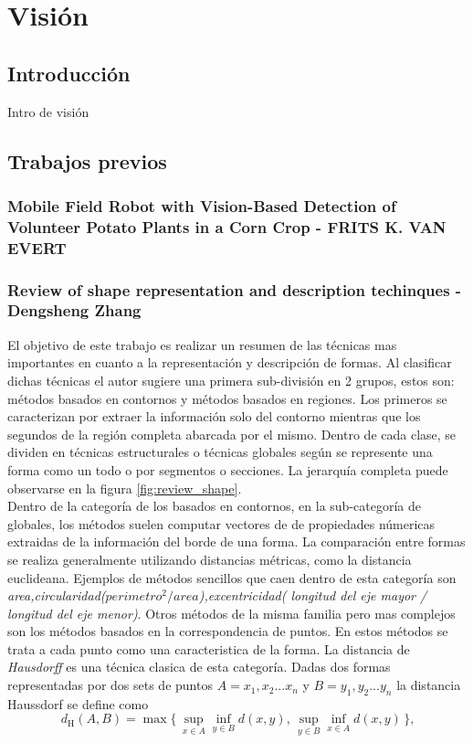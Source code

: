 ﻿\section{Visión}

\subsection{Introducción}
Intro de visión

\subsection{Trabajos previos}
	\subsubsection{Mobile Field Robot with Vision-Based Detection of Volunteer Potato Plants in a Corn Crop - FRITS K. VAN EVERT}
	\cite{potato}
	\subsubsection{Review of shape representation and description techinques - Dengsheng Zhang}
El objetivo de este trabajo es realizar un resumen de las técnicas mas importantes en cuanto a la representación y descripción de formas.
Al clasificar dichas técnicas el autor sugiere una primera sub-división en 2 grupos, estos son: métodos basados en contornos y métodos basados 
en regiones. Los primeros se caracterizan por extraer  la información solo del contorno mientras que los segundos de la región completa abarcada
por el mismo. Dentro de cada clase, se dividen en técnicas estructurales o técnicas globales según  se represente una forma como un todo o 
por segmentos o secciones. La jerarquía completa puede observarse en la figura \ref{fig:review_shape}.\\
\indent Dentro de la categoría de los basados en contornos, en la sub-categoría de globales, los métodos suelen computar vectores de 
de propiedades númericas extraidas de la información del borde de una forma. La comparación entre formas se realiza 
generalmente utilizando distancias métricas, como la distancia euclideana. Ejemplos de métodos sencillos que caen dentro de esta 
categoría son \textit{area,circularidad($perimetro^2 / area$),excentricidad( longitud del eje mayor / longitud del eje menor)}. Otros métodos 
de la misma familia pero mas complejos son los métodos basados en la correspondencia de puntos. En estos métodos se trata a cada punto como una 
caracteristica de la forma. La distancia de \textit{ Hausdorff} es una técnica clasica de esta categoría. Dadas dos formas representadas
por dos sets de puntos $A={x_1,x_2...x_n}$ y $B={y_1,y_2...y_n}$ la distancia Haussdorf se define como 
\[
	 d_{\mathrm H}(A,B) = \max\{\,\sup_{x \in A} \inf_{y \in B} d(x,y),\, \sup_{y \in B} \inf_{x \in A} d(x,y)\,\}\mbox{,}
\] 

